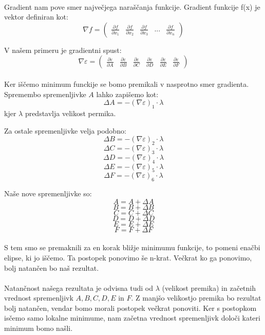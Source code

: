 \documentclass[a4paper, 12pt]{article}
\begin{document}
	\paragraph{}
	Gradient nam pove smer največjega naraščanja funkcije. Gradient funkcije f(x) je vektor definiran kot:
	$$\nabla f = \begin{pmatrix}\frac{\partial f}{\partial x_{1}} & \frac{\partial f}{\partial x_{2}} & \frac{\partial f}{\partial x_{3}} & ... & \frac{\partial f}{\partial x_{n}}\end{pmatrix}$$
	
	V našem primeru je gradientni spust:
	$$\nabla \varepsilon = 
	\begin{pmatrix}
	\frac{\partial \varepsilon}{\partial A} &
	\frac{\partial \varepsilon}{\partial B} &
	\frac{\partial \varepsilon}{\partial C} &
	\frac{\partial \varepsilon}{\partial D} &
	\frac{\partial \varepsilon}{\partial E} &
	\frac{\partial \varepsilon}{\partial F}
	\end{pmatrix}$$
	
	\paragraph{}
	Ker iščemo minimum funckije se bomo premikali v nasprotno smer gradienta. Spremembo spremenljivke $A$ lahko zapišemo kot:
	$$\Delta A = -(\nabla \varepsilon)_1 \cdot \lambda$$
	kjer $\lambda$ predstavlja velikost permika. 
	
	Za ostale spremenljivke velja podobno:
	$$\Delta B = -(\nabla \varepsilon)_2 \cdot \lambda$$
	$$\Delta C = -(\nabla \varepsilon)_3 \cdot \lambda$$
	$$\Delta D = -(\nabla \varepsilon)_4 \cdot \lambda$$
	$$\Delta E = -(\nabla \varepsilon)_5 \cdot \lambda$$
	$$\Delta F = -(\nabla \varepsilon)_6 \cdot \lambda$$
	
	Naše nove spremenljivke so:
	$$ A = A + \Delta A$$
	$$ B = B + \Delta B$$
	$$ C = C + \Delta C$$
	$$ D = D + \Delta D$$
	$$ E = E + \Delta E$$
	$$ F = F + \Delta F$$
	
	\paragraph{}
	S tem smo se premaknili za en korak bližje minimumu funkcije, to pomeni enačbi elipse, ki jo iščemo. Ta postopek ponovimo še n-krat. Večkrat ko ga ponovimo, bolj natančen bo naš rezultat.
	 
	\paragraph{}
	Natančnost našega rezultata je odvisna tudi od $\lambda$ (velikost premika) in začetnih vrednost spremenljivk $A, B, C, D, E$ in $F$. Z manjšo velikostjo premika bo rezultat bolj natančen, vendar bomo morali postopek večkrat ponoviti. Ker s postopkom isčemo samo lokalne minimume, nam začetna vrednost spremenljivk določi kateri minimum bomo našli.
\end{document}
